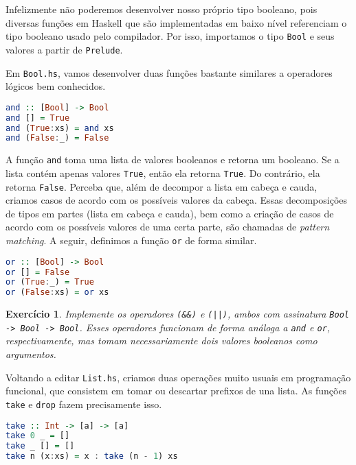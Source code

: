 \documentclass[a4paper]{article}
\newtheorem{exercicio}{Exercício}
\begin{document}
Infelizmente não poderemos desenvolver nosso próprio tipo booleano, pois diversas funções em Haskell que são implementadas em baixo nível referenciam o tipo booleano usado pelo compilador.
Por isso, importamos o tipo \texttt{Bool} e seus valores a partir de \texttt{Prelude}.

Em \texttt{Bool.hs}, vamos desenvolver duas funções bastante similares a operadores lógicos bem conhecidos.

\begin{lstlisting}[language=haskell, frame=single]
and :: [Bool] -> Bool
and [] = True
and (True:xs) = and xs
and (False:_) = False
\end{lstlisting}

A função \texttt{and} toma uma lista de valores booleanos e retorna um booleano.
Se a lista contém apenas valores \texttt{True}, então ela retorna \texttt{True}.
Do contrário, ela retorna \texttt{False}.
Perceba que, além de decompor a lista em cabeça e cauda, criamos casos de acordo com os possíveis valores da cabeça.
Essas decomposições de tipos em partes (lista em cabeça e cauda), bem como a criação de casos de acordo com os possíveis valores de uma certa parte, são chamadas de \emph{pattern matching}.
A seguir, definimos a função \texttt{or} de forma similar.

\begin{lstlisting}[language=haskell, frame=single]
or :: [Bool] -> Bool
or [] = False
or (True:_) = True
or (False:xs) = or xs
\end{lstlisting}

\begin{exercicio}
	Implemente os operadores \emph{\texttt{(\&\&)}} e \emph{\texttt{(||)}}, ambos com assinatura \emph{\texttt{Bool -> Bool -> Bool}}.
	Esses operadores funcionam de forma análoga a \emph{\texttt{and}} e \emph{\texttt{or}}, respectivamente, mas tomam necessariamente dois valores booleanos como argumentos.
\end{exercicio}

Voltando a editar \texttt{List.hs}, criamos duas operações muito usuais em programação funcional, que consistem em tomar ou descartar prefixos de una lista.
As funções \texttt{take} e \texttt{drop} fazem precisamente isso.

\begin{lstlisting}[language=haskell, frame=single]
take :: Int -> [a] -> [a]
take 0 _ = []
take _ [] = []
take n (x:xs) = x : take (n - 1) xs
\end{lstlisting}
\end{document}
